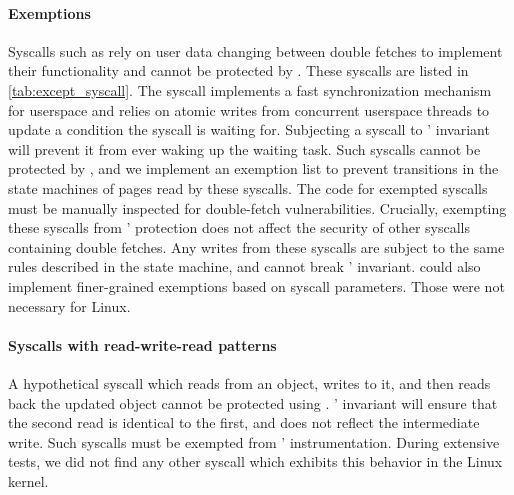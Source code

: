 \documentclass[letterpaper,twocolumn,10pt]{article}
\begin{document}
\paragraph{Exemptions}
Syscalls such as  rely on user data changing between double 
fetches to implement their functionality and cannot be protected by
\midas.
These syscalls are listed in \autoref{tab:except_syscall}.
The  syscall implements a fast synchronization mechanism
for userspace and relies on atomic writes from concurrent userspace
threads to update a condition the syscall is waiting for. 
Subjecting a  syscall to \midas' invariant will prevent
it from ever waking up the waiting task.
Such syscalls cannot be protected by \midas, and we implement an 
exemption list to prevent transitions in the state machines of pages read 
by these syscalls.
The code for exempted syscalls must be manually inspected for double-fetch 
vulnerabilities.
Crucially, exempting these syscalls from \midas' protection does not 
affect the security of other syscalls containing double fetches. 
Any writes from these syscalls are subject to the same rules described
in the state machine, and cannot break \midas' invariant.
\midas could also implement finer-grained exemptions based on syscall
parameters. Those were not necessary for Linux.
%


\paragraph{Syscalls with read-write-read patterns}
A hypothetical syscall which reads from an object, writes to it, and
then reads back the updated object cannot be protected using \midas.
\midas' invariant will ensure that the second read is identical to the first,
and does not reflect the intermediate write.
Such syscalls must be exempted from \midas' instrumentation.
During extensive tests, we did not find any other syscall which exhibits this behavior in the Linux
kernel. 
\end{document}
